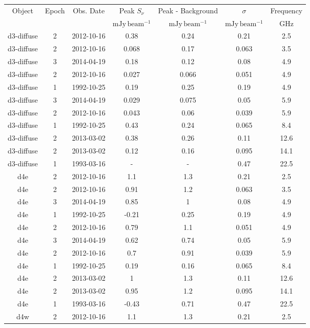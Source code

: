 \begin{longtable}[htp]
\caption{Continuum Point Sources}
\begin{longtable}{ccccccc}
\label{tab:contsrcs_full}
Object & Epoch & Obs. Date & Peak $S_{\nu}$ & Peak - Background & $\sigma$ & Frequency \\
 &  &  & $\mathrm{mJy\,beam^{-1}}$ & $\mathrm{mJy\,beam^{-1}}$ & $\mathrm{mJy\,beam^{-1}}$ & $\mathrm{GHz}$ \\
\hline
d3-diffuse & 2 & 2012-10-16 & 0.38 & 0.24 & 0.21 & 2.5 \\
d3-diffuse & 2 & 2012-10-16 & 0.068 & 0.17 & 0.063 & 3.5 \\
d3-diffuse & 3 & 2014-04-19 & 0.18 & 0.12 & 0.08 & 4.9 \\
d3-diffuse & 2 & 2012-10-16 & 0.027 & 0.066 & 0.051 & 4.9 \\
d3-diffuse & 1 & 1992-10-25 & 0.19 & 0.25 & 0.19 & 4.9 \\
d3-diffuse & 3 & 2014-04-19 & 0.029 & 0.075 & 0.05 & 5.9 \\
d3-diffuse & 2 & 2012-10-16 & 0.043 & 0.06 & 0.039 & 5.9 \\
d3-diffuse & 1 & 1992-10-25 & 0.43 & 0.24 & 0.065 & 8.4 \\
d3-diffuse & 2 & 2013-03-02 & 0.38 & 0.26 & 0.11 & 12.6 \\
d3-diffuse & 2 & 2013-03-02 & 0.12 & 0.16 & 0.095 & 14.1 \\
d3-diffuse & 1 & 1993-03-16 & - & - & 0.47 & 22.5 \\
d4e & 2 & 2012-10-16 & 1.1 & 1.3 & 0.21 & 2.5 \\
d4e & 2 & 2012-10-16 & 0.91 & 1.2 & 0.063 & 3.5 \\
d4e & 3 & 2014-04-19 & 0.85 & 1 & 0.08 & 4.9 \\
d4e & 1 & 1992-10-25 & -0.21 & 0.25 & 0.19 & 4.9 \\
d4e & 2 & 2012-10-16 & 0.79 & 1.1 & 0.051 & 4.9 \\
d4e & 3 & 2014-04-19 & 0.62 & 0.74 & 0.05 & 5.9 \\
d4e & 2 & 2012-10-16 & 0.7 & 0.91 & 0.039 & 5.9 \\
d4e & 1 & 1992-10-25 & 0.19 & 0.16 & 0.065 & 8.4 \\
d4e & 2 & 2013-03-02 & 1 & 1.3 & 0.11 & 12.6 \\
d4e & 2 & 2013-03-02 & 0.95 & 1.2 & 0.095 & 14.1 \\
d4e & 1 & 1993-03-16 & -0.43 & 0.71 & 0.47 & 22.5 \\
d4w & 2 & 2012-10-16 & 1.1 & 1.3 & 0.21 & 2.5 \\

\end{longtable}
\end{longtable}
